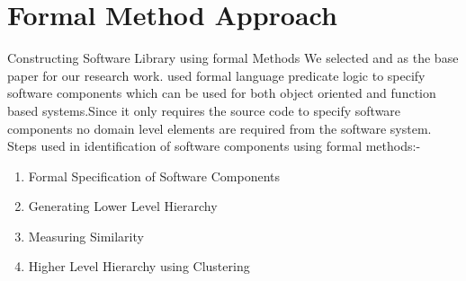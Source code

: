 \documentclass{beamer}
\begin{document}
\section{Formal Method Approach}
\begin{frame}{Constructing Software Library using formal Methods}
	We selected \cite{formal} and \cite{survey} as the base paper for our research work.\cite{formal} used formal language predicate logic to specify software components which can be used for both object oriented and function based systems.Since it only requires the source code to specify software components no domain level elements are required from the software system.\\
	Steps used in identification of software components using formal methods:-
	\begin{enumerate}
		\item Formal Specification of Software Components
		\item Generating Lower Level Hierarchy
		\item Measuring Similarity 
		\item Higher Level Hierarchy using Clustering
	\end{enumerate}
\end{frame}
\end{document}
